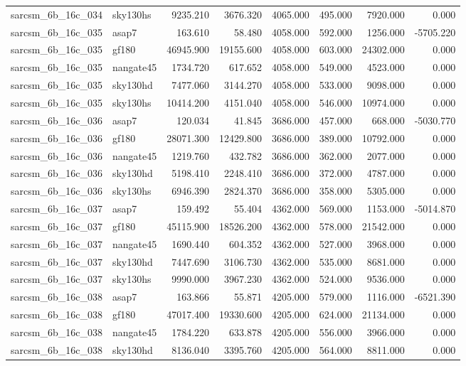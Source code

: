 \begin{tabular}{llrrrrrr}
sarcsm\_6b\_16c\_034 & sky130hs & 9235.210 & 3676.320 & 4065.000 & 495.000 & 7920.000 & 0.000 \\
sarcsm\_6b\_16c\_035 & asap7 & 163.610 & 58.480 & 4058.000 & 592.000 & 1256.000 & -5705.220 \\
sarcsm\_6b\_16c\_035 & gf180 & 46945.900 & 19155.600 & 4058.000 & 603.000 & 24302.000 & 0.000 \\
sarcsm\_6b\_16c\_035 & nangate45 & 1734.720 & 617.652 & 4058.000 & 549.000 & 4523.000 & 0.000 \\
sarcsm\_6b\_16c\_035 & sky130hd & 7477.060 & 3144.270 & 4058.000 & 533.000 & 9098.000 & 0.000 \\
sarcsm\_6b\_16c\_035 & sky130hs & 10414.200 & 4151.040 & 4058.000 & 546.000 & 10974.000 & 0.000 \\
sarcsm\_6b\_16c\_036 & asap7 & 120.034 & 41.845 & 3686.000 & 457.000 & 668.000 & -5030.770 \\
sarcsm\_6b\_16c\_036 & gf180 & 28071.300 & 12429.800 & 3686.000 & 389.000 & 10792.000 & 0.000 \\
sarcsm\_6b\_16c\_036 & nangate45 & 1219.760 & 432.782 & 3686.000 & 362.000 & 2077.000 & 0.000 \\
sarcsm\_6b\_16c\_036 & sky130hd & 5198.410 & 2248.410 & 3686.000 & 372.000 & 4787.000 & 0.000 \\
sarcsm\_6b\_16c\_036 & sky130hs & 6946.390 & 2824.370 & 3686.000 & 358.000 & 5305.000 & 0.000 \\
sarcsm\_6b\_16c\_037 & asap7 & 159.492 & 55.404 & 4362.000 & 569.000 & 1153.000 & -5014.870 \\
sarcsm\_6b\_16c\_037 & gf180 & 45115.900 & 18526.200 & 4362.000 & 578.000 & 21542.000 & 0.000 \\
sarcsm\_6b\_16c\_037 & nangate45 & 1690.440 & 604.352 & 4362.000 & 527.000 & 3968.000 & 0.000 \\
sarcsm\_6b\_16c\_037 & sky130hd & 7447.690 & 3106.730 & 4362.000 & 535.000 & 8681.000 & 0.000 \\
sarcsm\_6b\_16c\_037 & sky130hs & 9990.000 & 3967.230 & 4362.000 & 524.000 & 9536.000 & 0.000 \\
sarcsm\_6b\_16c\_038 & asap7 & 163.866 & 55.871 & 4205.000 & 579.000 & 1116.000 & -6521.390 \\
sarcsm\_6b\_16c\_038 & gf180 & 47017.400 & 19330.600 & 4205.000 & 624.000 & 21134.000 & 0.000 \\
sarcsm\_6b\_16c\_038 & nangate45 & 1784.220 & 633.878 & 4205.000 & 556.000 & 3966.000 & 0.000 \\
sarcsm\_6b\_16c\_038 & sky130hd & 8136.040 & 3395.760 & 4205.000 & 564.000 & 8811.000 & 0.000 \\

\end{tabular}
